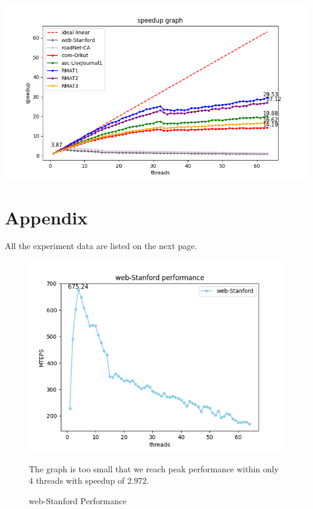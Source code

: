 \documentclass[10pt,twocolumn,letterpaper]{article}
\begin{document}
\begin{strip}
    \centering
    \includegraphics[scale=0.8]{figures/speedup.png}
\end{strip}

\newpage



\section{Appendix}

All the experiment data are listed on the next page.

\begin{figure}[h]
    \centering
    \includegraphics[scale=0.5]{figures/web-Stanford.png}
    \caption{web-Stanford Performance}
    \label{fig:web-Stanford}
    The graph is too small that we reach peak performance within only $4$ threads with speedup of $2.972$.
\end{figure}
\end{document}
